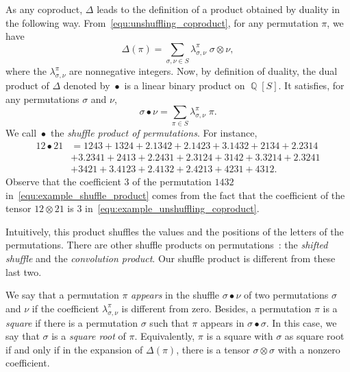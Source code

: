 \documentclass[a4paper,10pt]{llncs}
\DeclareMathOperator{\QQ}{\mathbb{Q}}
\DeclareMathOperator{\SHUFFLE}{\bullet}
\begin{document}
As any coproduct, $\Delta$ leads to the definition of a product obtained
by duality in the following way. From~\eqref{equ:unshuffling_coproduct},
for any permutation $\pi$, we have
\begin{equation}
    \Delta(\pi) =
    \sum_{\sigma, \nu \in S} \lambda_{\sigma, \nu}^\pi \;
    \sigma \otimes \nu,
\end{equation}
where the $\lambda_{\sigma, \nu}^\pi$ are nonnegative integers. Now,
by definition of duality, the dual product of $\Delta$ denoted by
$\SHUFFLE$ is a linear binary product on $\QQ[S]$. It satisfies, for any
permutations
$\sigma$ and $\nu$,
\begin{equation}
    \sigma \SHUFFLE \nu =
    \sum_{\pi \in S}
    \lambda_{\sigma, \nu}^\pi \; \pi.
\end{equation}
We call $\SHUFFLE$ the {\em shuffle product of permutations}. For instance,
\begin{equation}\begin{split} \label{equ:example_shuffle_product}
    12 \SHUFFLE 21 & =
    1243 + 1324 + 2.1342 + 2.1423 + 3.1432 + 2134 + 2.2314 \\
    & + 3.2341 + 2413 + 2.2431 + 2.3124 + 3142 + 3.3214 + 2.3241 \\
    & + 3421 + 3.4123 + 2.4132 + 2.4213 + 4231 + 4312.
\end{split}\end{equation}
Observe that the coefficient $3$ of the permutation $1432$
in~\eqref{equ:example_shuffle_product} comes from the fact that the
coefficient of the tensor $12 \otimes 21$ is $3$
in~\eqref{equ:example_unshuffling_coproduct}.
\medskip

Intuitively, this product shuffles the values and the positions of the
letters of the permutations. There are other shuffle products on
permutations~\cite{DHT:IJAC:2002}: the {\em shifted shuffle} and the
{\em convolution product}. Our shuffle product is different from these
last two.
\medskip

We say that a permutation $\pi$ {\em appears} in the shuffle
$\sigma \SHUFFLE \nu$ of two permutations $\sigma$ and $\nu$ if the
coefficient $\lambda_{\sigma, \nu}^\pi$ is different from zero. Besides,
a permutation $\pi$ is a {\em square} if there is a permutation $\sigma$
such that $\pi$ appears in $\sigma \SHUFFLE \sigma$. In this case, we
say that $\sigma$ is a {\em square root} of $\pi$. Equivalently, $\pi$
is a square with $\sigma$ as square root if and only if in the expansion
of $\Delta(\pi)$, there is a tensor $\sigma \otimes \sigma$ with a
nonzero coefficient.
\medskip
\end{document}
